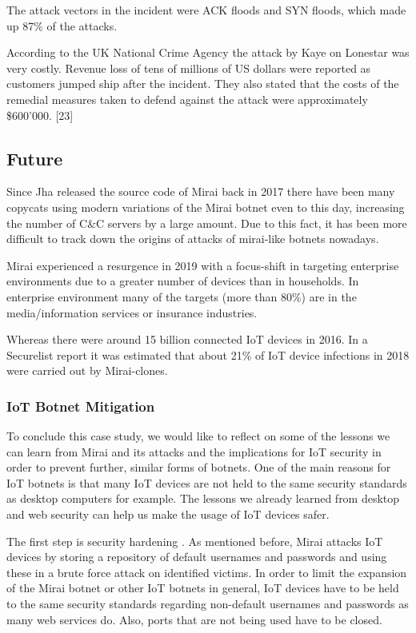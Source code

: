 The attack vectors in the incident were ACK floods and SYN floods, which made up 87\% of the attacks. \cite{Antonakakis17}

According to the UK National Crime Agency the attack by Kaye on Lonestar was very costly. Revenue loss of tens of millions of US dollars were reported as customers jumped ship after the incident. They also stated that the costs of the remedial measures taken to defend against the attack were approximately \$600'000. [23]

	
	\subsection{Future}
Since Jha released the source code of Mirai back in 2017 there have been many copycats using modern variations of the Mirai botnet even to this day, increasing the number of C\&C servers by a large amount. Due to this fact, it has been more difficult to track down the origins of attacks of mirai-like botnets nowadays.

Mirai experienced a resurgence in 2019 with a focus-shift in targeting enterprise environments due to a greater number of devices than in households. In enterprise environment many of the targets (more than 80\%) are in the media/information services or insurance industries. \cite{Lemos19}

Whereas there were around 15 billion connected IoT devices in 2016. \cite{Ericsson} In a Securelist report it was estimated that about 21\% of IoT device infections in 2018 were carried out by Mirai-clones. \cite{Eremin19}

\subsubsection{IoT Botnet Mitigation}
To conclude this case study, we would like to reflect on some of the lessons we can learn from Mirai and its attacks and the implications for IoT security in order to prevent further, similar forms of botnets. One of the main reasons for IoT botnets is that many IoT devices are not held to the same security standards as desktop computers for example. The lessons we already learned from desktop and web security can help us make the usage of IoT devices safer.

The first step is security hardening \cite{Antonakakis17}. As mentioned before, Mirai attacks IoT devices by storing a repository of default usernames and passwords and using these in a brute force attack on identified victims.  In order to limit the expansion of the Mirai botnet or other IoT botnets in general, IoT devices have to be held to the same security standards regarding non-default usernames and passwords as many web services do. Also, ports that are not being used have to be closed.

